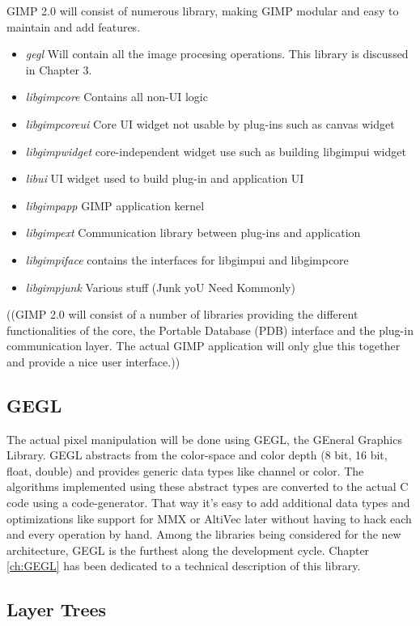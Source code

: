 GIMP 2.0 will consist of numerous library, making GIMP modular and easy to maintain and add features.   
\begin{itemize}
\item {\em gegl} Will contain all the image procesing operations. This library is discussed in Chapter 3.
\item {\em libgimpcore} Contains all non-UI logic
\item {\em libgimpcoreui} Core UI widget not usable by plug-ins such as canvas widget
\item {\em libgimpwidget} core-independent widget use such as building libgimpui widget
\item {\em libui} UI widget used to build plug-in and application UI
\item {\em libgimpapp} GIMP application kernel
\item {\em libgimpext} Communication library between plug-ins and application
\item {\em libgimpiface} contains the interfaces for libgimpui and libgimpcore
\item {\em libgimpjunk} Various stuff (Junk yoU Need Kommonly)
\end{itemize}

((GIMP 2.0 will consist of a number of libraries providing the different
functionalities of the core, the Portable Database (PDB) interface and
the plug-in communication layer. The actual GIMP application will only
glue this together and provide a nice user interface.))

\subsection{GEGL}

The actual pixel manipulation will be done using GEGL, the GEneral
Graphics Library. GEGL abstracts from the color-space and color depth
(8 bit, 16 bit, float, double) and provides generic data types like
channel or color. The algorithms implemented using these abstract
types are converted to the actual C code using a code-generator. That
way it's easy to add additional data types and optimizations like
support for MMX or AltiVec later without having to hack each and every
operation by hand. Among the libraries being considered for the new
architecture, GEGL is the furthest along the development cycle.
Chapter \ref{ch:GEGL} has been dedicated to a technical description
of this library.

\subsection{Layer Trees}
 
